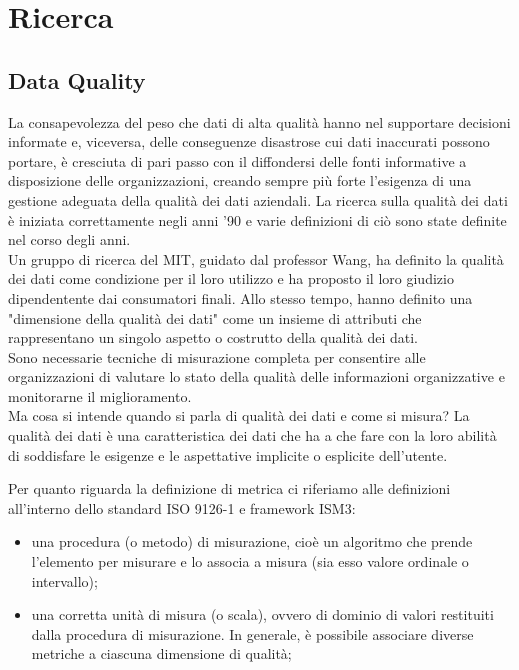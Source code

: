 \documentclass[a4paper,12pt]{article}
\begin{document}
\tableofcontents

\newpage

\section{Ricerca} 

\subsection{Data Quality}

La consapevolezza del peso che dati di alta qualità hanno nel supportare decisioni informate e, viceversa, delle conseguenze disastrose cui dati inaccurati possono portare, è cresciuta di pari passo con il diffondersi delle fonti informative a disposizione delle organizzazioni, creando sempre più forte l’esigenza di una gestione adeguata della qualità dei dati aziendali. La ricerca sulla qualità dei dati è iniziata correttamente negli anni '90 e varie definizioni di ciò sono state definite nel corso degli anni. \\

\noindent Un gruppo di ricerca del MIT, guidato dal professor Wang, ha definito la qualità dei dati come condizione per il loro utilizzo e ha proposto il loro giudizio dipendentente dai consumatori finali. Allo stesso tempo, hanno definito una "dimensione della qualità dei dati" come un insieme di attributi che rappresentano un singolo aspetto o costrutto della qualità dei dati. \\

\noindent Sono necessarie tecniche di misurazione completa per consentire alle organizzazioni di valutare lo stato della qualità delle informazioni organizzative e monitorarne il miglioramento. \\

\noindent Ma cosa si intende quando si parla di qualità dei dati e come si misura? 
La qualità dei dati è una caratteristica dei dati che ha a che fare con la loro abilità di soddisfare le esigenze e le aspettative implicite o esplicite dell'utente. 

\noindent Per quanto riguarda la definizione di metrica ci riferiamo alle definizioni all'interno dello standard ISO 9126-1 e framework ISM3:
\begin{itemize}
	\item una procedura (o metodo) di misurazione, cioè un algoritmo che prende l'elemento per misurare e lo associa a misura (sia esso valore ordinale o intervallo); 
	\item una corretta unità di misura (o scala), ovvero di dominio di valori restituiti dalla procedura di misurazione. In generale, è possibile associare diverse metriche a ciascuna dimensione di qualità;
\end{itemize} 
\end{document}
